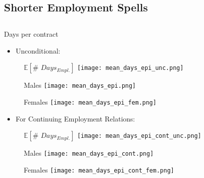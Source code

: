 \documentclass[hyperref={bookmarks=false}]{beamer}
\begin{document}
\begin{appendix}
\section{Shorter Employment Spells}
\subsection{}

\begin{frame}
\label{SES}
\end{frame}

\begin{frame}{Days per contract}
\begin{itemize}
\item  Unconditional:
\end{itemize}
\begin{figure}[!t]
\centering
\begin{minipage}[b]{0.3\textwidth}{$\mathbb{E}[\# \,\, Days_{Empl.}]$}
\centering
\texttt{[image: mean\_days\_epi\_unc.png]}
\end{minipage}
\begin{minipage}[b]{0.3\textwidth}{Males}
\centering
\texttt{[image: mean\_days\_epi.png]}
\end{minipage}
\begin{minipage}[b]{0.3\textwidth}{Females}
\centering
\texttt{[image: mean\_days\_epi\_fem.png]}
\end{minipage}
\end{figure}
\begin{itemize}
\item  For Continuing Employment Relations:
\end{itemize}
\begin{figure}[!t]
\begin{minipage}[b]{0.3\textwidth}{$\mathbb{E}[\# \,\, Days_{Empl.}]$}
\centering
\texttt{[image: mean\_days\_epi\_cont\_unc.png]}
\end{minipage}
\begin{minipage}[b]{0.3\textwidth}{Males}
\centering
\texttt{[image: mean\_days\_epi\_cont.png]}
\end{minipage}
\begin{minipage}[b]{0.3\textwidth}{Females}
\centering
\texttt{[image: mean\_days\_epi\_cont\_fem.png]}
\end{minipage}
\end{figure}
\end{frame}


\end{appendix}
\end{document}
